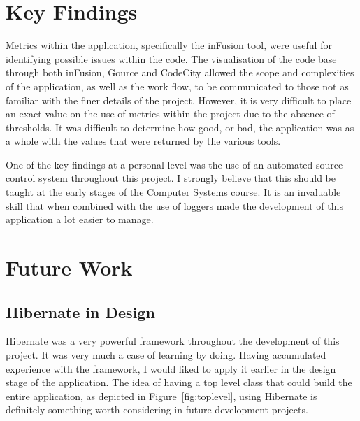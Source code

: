\section{Key Findings}

Metrics within the application, specifically the inFusion tool, were useful for identifying possible issues within the code. The visualisation of the code base through both inFusion, Gource and CodeCity allowed the scope and complexities of the application, as well as the work flow, to be communicated to those not as familiar with the finer details of the project. However, it is very difficult to place an exact value on the use of metrics within the project due to the absence of thresholds. It was difficult to determine how good, or bad, the application was as a whole with the values that were returned by the various tools. 

One of the key findings at a personal level was the use of an automated source control system throughout this project. I strongly believe that this should be taught at the early stages of the Computer Systems course. It is an invaluable skill that when combined with the use of loggers made the development of this application a lot easier to manage.

\section{Future Work}

\subsection{Hibernate in Design}
Hibernate was a very powerful framework throughout the development of this project. It was very much a case of learning by doing. Having accumulated experience with the framework, I would liked to apply it earlier in the design stage of the application. The idea of having a top level class that could build the entire application, as depicted in Figure~\ref{fig:toplevel}, using Hibernate is definitely something worth considering in future development projects.



